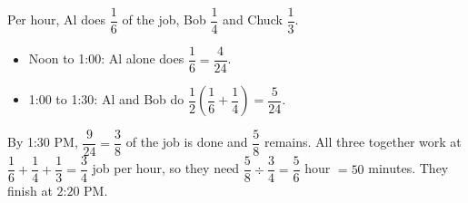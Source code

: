 Per hour, Al does $\dfrac{1}{6}$ of the job, Bob $\dfrac{1}{4}$ and Chuck $\dfrac{1}{3}$.
\begin{itemize}
\item Noon to 1:00: Al alone does $\dfrac{1}{6}=\dfrac{4}{24}$.
\item 1:00 to 1:30: Al and Bob do $\dfrac{1}{2}\left(\dfrac{1}{6}+\dfrac{1}{4}\right)=\dfrac{5}{24}$.
\end{itemize}
By 1:30 PM, $\dfrac{9}{24}=\dfrac{3}{8}$ of the job is done and $\dfrac{5}{8}$ remains. All three together work at $\dfrac{1}{6}+\dfrac{1}{4}+\dfrac{1}{3}=\dfrac{3}{4}$ job per hour, so they need $\dfrac{5}{8}\div\dfrac{3}{4}=\dfrac{5}{6}$ hour $=50$ minutes. They finish at $\boxed{\text{2:20 PM}}$.
